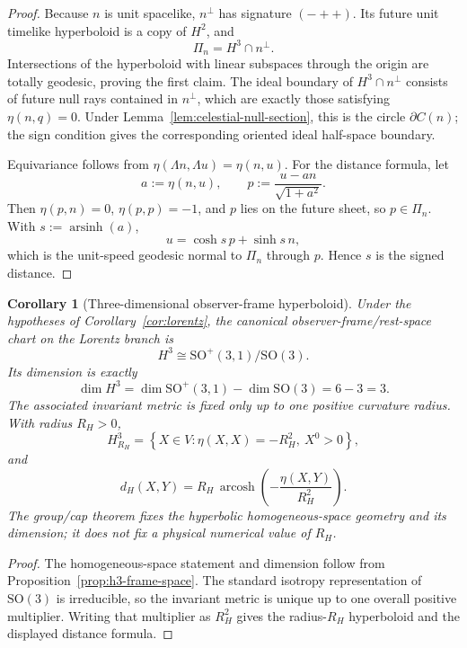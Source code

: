 \documentclass[11pt]{article}
\newtheorem{corollary}[theorem]{Corollary}
\begin{document}
\begin{proof}
Because \(n\) is unit spacelike, \(n^\perp\) has signature \((-++)\). Its
future unit timelike hyperboloid is a copy of \(H^2\), and
\[
\Pi_n=H^3\cap n^\perp.
\]
Intersections of the hyperboloid with linear subspaces through the origin are
totally geodesic, proving the first claim. The ideal boundary of
\(H^3\cap n^\perp\) consists of future null rays contained in \(n^\perp\),
which are exactly those satisfying \(\eta(n,q)=0\). Under
Lemma~\ref{lem:celestial-null-section}, this is the circle \(\partial C(n)\);
the sign condition gives the corresponding oriented ideal half-space boundary.

Equivariance follows from \(\eta(\Lambda n,\Lambda u)=\eta(n,u)\). For the
distance formula, let
\[
a:=\eta(n,u),
\qquad
p:=\frac{u-a n}{\sqrt{1+a^2}}.
\]
Then \(\eta(p,n)=0\), \(\eta(p,p)=-1\), and \(p\) lies on the future sheet, so
\(p\in\Pi_n\). With \(s:=\operatorname{arsinh}(a)\),
\[
u=\cosh s\,p+\sinh s\,n,
\]
which is the unit-speed geodesic normal to \(\Pi_n\) through \(p\). Hence
\(s\) is the signed distance.
\end{proof}

\begin{corollary}[Three-dimensional observer-frame hyperboloid]
\label{cor:h3-spatial-chart}
Under the hypotheses of Corollary~\ref{cor:lorentz}, the canonical
observer-frame/rest-space chart on the Lorentz branch is
\[
\boxed{
H^3\cong\mathrm{SO}^{+}(3,1)/\mathrm{SO}(3).
}
\]
Its dimension is exactly
\[
\boxed{
\dim H^3=\dim\mathrm{SO}^{+}(3,1)-\dim\mathrm{SO}(3)=6-3=3.
}
\]
The associated invariant metric is fixed only up to one positive curvature
radius. With radius \(R_H>0\),
\[
H^3_{R_H}=\left\{X\in V:\eta(X,X)=-R_H^2,\ X^0>0\right\},
\]
and
\[
d_H(X,Y)=
R_H\,
\operatorname{arcosh}
\left(-\frac{\eta(X,Y)}{R_H^2}\right).
\]
The group/cap theorem fixes the hyperbolic homogeneous-space geometry and its
dimension; it does not fix a physical numerical value of \(R_H\).
\end{corollary}

\begin{proof}
The homogeneous-space statement and dimension follow from
Proposition~\ref{prop:h3-frame-space}. The standard isotropy representation
of \(\mathrm{SO}(3)\) is irreducible, so the invariant metric is unique up to
one overall positive multiplier. Writing that multiplier as \(R_H^2\) gives
the radius-\(R_H\) hyperboloid and the displayed distance formula.
\end{proof}
\end{document}
